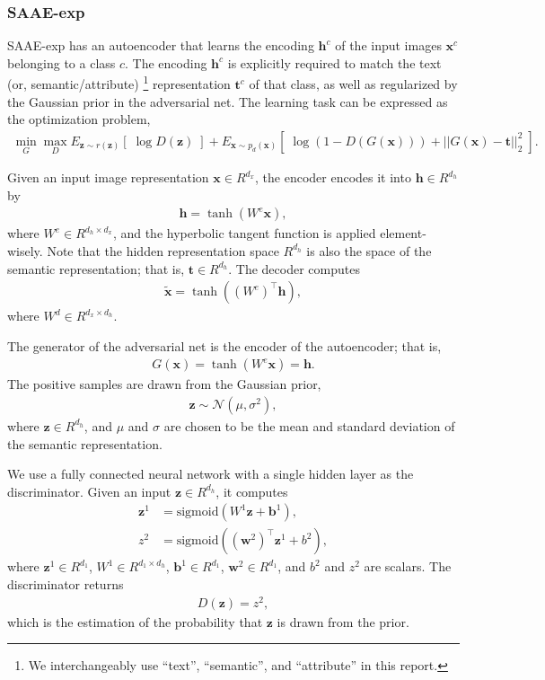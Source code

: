 \documentclass{article}
\newcommand{\bb}[1]{\boldsymbol{#1}}
\begin{document}

\subsubsection{SAAE-exp}
\label{subsubsec:NoisePrior}

	SAAE-exp has an autoencoder that learns the encoding $\bb{h}^c$ of the input images $\bb{x}^c$ belonging to a class $c$. The encoding $\bb{h}^c$ is explicitly required to match the text (or, semantic/attribute)%
	\footnote{We interchangeably use ``text'', ``semantic'', and ``attribute'' in this report.} %
	representation $\bb{t}^c$ of that class, as well as regularized by the Gaussian prior in the adversarial net. The learning task can be expressed as the optimization problem,
	\begin{align}
	\min_{G} \max_D E_{\bb{z} \sim r(\bb{z})}\left[\; \log D(\bb{z}) \;\right] + E_{\bb{x} \sim p_d(\bb{x})}\left[\; \log( 1 - D(G(\bb{x})) ) + || G(\bb{x}) - \bb{t} ||_2^2 \;\right].
	\end{align}

	Given an input image representation $\bb{x} \in R^{d_x}$, the encoder encodes it into $\bb{h} \in R^{d_h}$ by
	\begin{align}
		\bb{h} = \tanh(W^e \bb{x}),
	\end{align}
	where $W^e \in R^{d_h \times d_x}$, and the hyperbolic tangent function is applied element-wisely. Note that the hidden representation space $R^{d_h}$ is also the space of the semantic representation; that is, $\bb{t} \in R^{d_h}$. The decoder computes
	\begin{align}
		\tilde{\bb{x}} = \tanh((W^e)^{\top} \bb{h}),
	\end{align}
	where $W^d \in R^{d_x \times d_h}$.
	
	The generator of the adversarial net is the encoder of the autoencoder; that is,
	\begin{align}
		G(\bb{x}) = \tanh(W^e \bb{x}) = \bb{h}.
	\end{align}
	The positive samples are drawn from the Gaussian prior,
	\begin{align}
		\bb{z} \sim \mathcal{N}(\mu, \sigma^2),
	\end{align}
	where $\bb{z} \in R^{d_h}$, and $\mu$ and $\sigma$ are chosen to be the mean and standard deviation of the semantic representation.
	
	We use a fully connected neural network with a single hidden layer as the discriminator. Given an input $\bb{z} \in R^{d_h}$, it computes
	\begin{align}
		\bb{z}^1 &= \textrm{sigmoid}( W^1 \bb{z} + \bb{b}^1 ), \\
		z^2 &= \textrm{sigmoid}( (\bb{w}^2)^{\top} \bb{z}^1 + b^2 ),
	\end{align}
	where $\bb{z}^1 \in R^{d_1}$, $W^1 \in R^{d_1 \times d_h}$, $\bb{b}^1 \in R^{d_1}$, $\bb{w}^2 \in R^{d_1}$, and $b^2$ and $z^2$ are scalars. The discriminator returns
	\begin{align}
		D(\bb{z}) = z^2,
	\end{align}
	which is the estimation of the probability that $\bb{z}$ is drawn from the prior.
	
\end{document}
